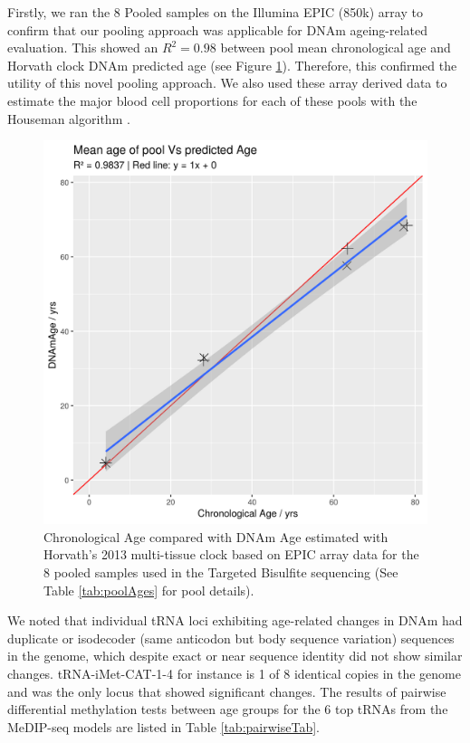 \documentclass[
]{book}
\begin{document}
Firstly, we ran the 8 Pooled samples on the Illumina EPIC (850k) array to confirm that our pooling approach was applicable for DNAm ageing-related evaluation.
This showed an \(R^2 = 0.98\) between pool mean chronological age and Horvath clock DNAm predicted age \citep{Horvath2013}(see Figure \ref{fig:DNAmAgeVsChronAge}).
Therefore, this confirmed the utility of this novel pooling approach.
We also used these array derived data to estimate the major blood cell proportions for each of these pools with the Houseman algorithm \citep{Houseman2012}.

\begin{figure}

{\centering \includegraphics[width=0.6\linewidth]{./figs/DNAmAgeVsChronAge} 

}

\caption{Chronological Age compared with DNAm Age estimated with Horvath's 2013 multi-tissue clock \citep{Horvath2013} based on EPIC array data for the 8 pooled samples used in the Targeted Bisulfite sequencing (See Table \ref{tab:poolAges} for pool details).}\label{fig:DNAmAgeVsChronAge}
\end{figure}



We noted that individual tRNA loci exhibiting age-related changes in DNAm had duplicate or isodecoder (same anticodon but body sequence variation) sequences in the genome, which despite exact or near sequence identity did not show similar changes.
tRNA-iMet-CAT-1-4 for instance is 1 of 8 identical copies in the genome and was the only locus that showed significant changes.
The results of pairwise differential methylation tests between age groups for the 6 top tRNAs from the MeDIP-seq models are listed in Table \ref{tab:pairwiseTab}.
\end{document}
